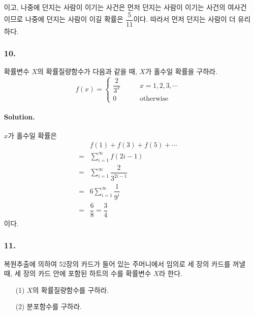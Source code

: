 이고, 나중에 던지는 사람이 이기는 사건은 먼저 던지는 사람이 이기는 사건의 여사건이므로 나중에 던지는 사람이 이길 확률은 $\dfrac{5}{11}$이다. 따라서 먼저 던지는 사람이 더 유리하다.


\subsubsection{10.} 확률변수 $X$의 확률질량함수가 다음과 같을 때, $X$가 홀수일 확률을 구하라.
\[f\left(x\right) = \left\{
\begin{array}{ll}
	\dfrac{2}{3^x} & \qquad x = 1, 2, 3, \cdots \\
	0 & \qquad\textrm{otherwise}
\end{array}
\right. \]

\paragraph{Solution.} $x$가 홀수일 확률은
\begin{align*}
	&f\left(1\right) + f\left(3\right) + f\left(5\right) + \cdots \\
	=&\sum_{i = 1}^{\infty} f\left(2i - 1\right) \\
	=&\sum_{i = 1}^{\infty} \dfrac{2}{3^{2i - 1}} \\
	=&6 \sum_{i = 1}^{\infty} \dfrac{1}{9^i} \\
	=&\dfrac{6}{8} = \dfrac{3}{4}
\end{align*}
이다. 

\subsubsection{11.} 복원추출에 의하여 52장의 카드가 들어 있는 주머니에서 임의로 세 장의 카드를 꺼낼 때, 세 장의 카드 안에 포함된 하트의 수를 확률변수 $X$라 한다.
\begin{itemize}
  \item [(1)] $X$의 확률질량함수를 구하라.
  \item [(2)] 분포함수를 구하라.
\end{itemize}


